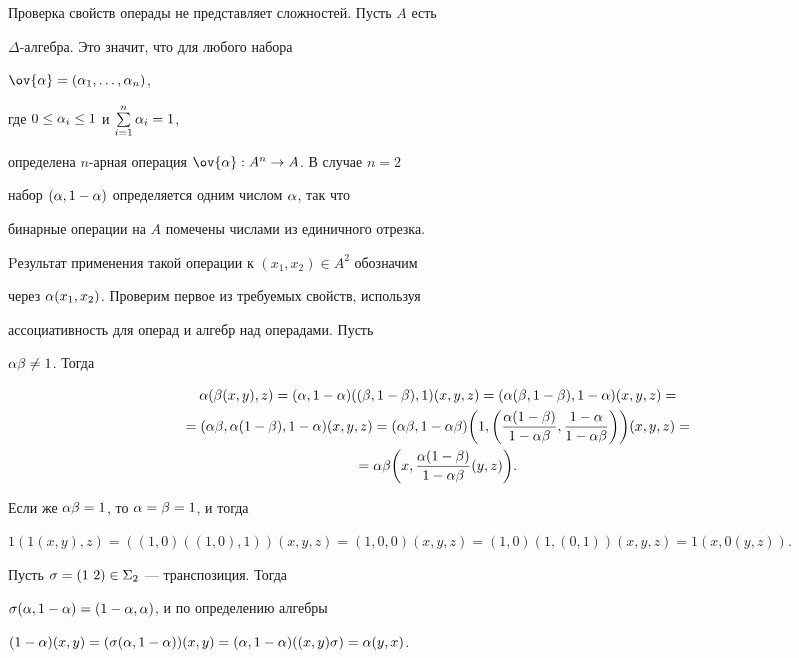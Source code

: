 \begin{pf}


Проверка свойств операды не представляет сложностей. Пусть $A$ есть


$\Delta$-алгебра. Это значит, что для любого набора


$\ov{\al}=(\al_1,\dotsc,\al_n)$,


где $0\le \alpha_i\le 1$ и $\sum\limits_{i=1}^n \alpha_i=1$,


определена $n$-арная операция $ \ov{\al}:A^n\to A$. В случае $n=2$


набор $(\alpha,1-\alpha)$ определяется одним числом $\alpha$, так что


бинарные операции на $A$ помечены числами из единичного отрезка.


Pезультат применения такой операции к $(x_1,x_2)\in A^2$ обозначим


через $\alpha(x_1,x_2)$. Проверим первое из требуемых свойств, используя


ассоциативность для операд и алгебр над операдами. Пусть


$\alpha\beta\neq 1$. Тогда


\begin{multline*}


\al(\be(x,y),z) = (\al,1-\al)((\be,1-\be),1)(x,y,z)=


(\al(\be,1-\be),1-\al)(x,y,z)=\\


%


=(\al\be,\al(1-\be),1-\al)(x,y,z)=


(\al\be,1-\al\be)\bigg(1,\bigg(\frac{\al(1-\be)}{1-\al\be},


\frac{1-\al}{1-\al\be}\bigg)\bigg)(x,y,z)= \\


=\al\be \bigg(x,\frac{\al(1-\be)}{1-\al\be}(y,z)\bigg).


\end{multline*}


Если же $\alpha\beta=1$, то $\alpha=\beta=1$, и тогда


$1(1(x,y),z)=((1,0)((1,0),1))(x,y,z)=(1,0,0)(x,y,z)=(1,0)(1,(0,1))(x,y,z)=


1(x,0(y,z))$.


Пусть $\sigma=(1\ 2)\in \Sigma_2$ --- транспозиция. Тогда


$\sigma(\alpha,1-\alpha)=(1-\alpha,\alpha)$, и по определению алгебры


$(1-\alpha)(x,y)=(\sigma(\alpha,1-\alpha))(x,y)=(\alpha,1-\alpha)((x,y)\sigma)=\alpha(y,x)$.






\end{pf}
